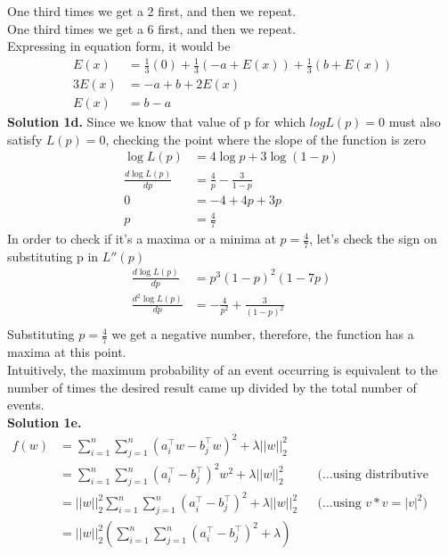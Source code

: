 \documentclass[11pt]{article}
\begin{document}
One third times we get a 2 first, and then we repeat. \\
One third times we get a 6 first, and then we repeat. \\
\linebreak
Expressing in equation form, it would be \\
\begin{equation*}\
\begin{split}
E(x) & = \frac{1}{3}(0) + \frac{1}{3}(-a + E(x)) + \frac{1}{3}(b + E(x)) \\
3 E(x) & = -a + b + 2E(x) \\
E(x) & = b-a
\end{split}
\end{equation*}
\linebreak
\textbf{Solution 1d.} Since we know that value of p for which $log L(p) = 0$ must also satisfy $L(p) = 0$, checking the point where the slope of the function is zero  \\
\begin{equation*}
\begin{split}
\log L(p) & = 4\log p + 3\log (1-p)\\
\frac{d \log L(p)}{d p} & = \frac{4}{p} - \frac{3}{1-p}\\
0 & = - 4 + 4p + 3p\\
p & = \frac{4}{7}
\end{split}
\end{equation*}
In order to check if it's a maxima or a minima at $ p = \frac{4}{7}$, let's check the sign on substituting p in $L''(p)$ \\
\begin{equation*}
\begin{split}
\frac{d \log L(p)}{d p} & = p^3 (1-p)^2 (1-7p)\\
\frac{d^2 \log L(p)}{d p} & = - \frac{4}{p^2} + \frac{3}{(1-p)^2}\\
\end{split}
\end{equation*}
Substituting $p= \frac{4}{7}$ we get a negative number, therefore, the function has a maxima at this point.\\
Intuitively, the maximum probability of an event occurring is equivalent to the number of times the desired result came up divided by the total number of events. \\
\linebreak
\textbf{Solution 1e.} \\
\begin{align*}
f(w) & = \sum_{i=1}^{n}\sum_{j=1}^{n} (a_i^\top w - b_j^\top w)^2 + \lambda||w||_2^2 \\
& = \sum_{i=1}^{n}\sum_{j=1}^{n} (a_i^\top - b_j^\top)^2 w^2 + \lambda||w||_2^2 && \text{(...using distributive property)} \\ 
& = ||w||_2^2 \sum_{i=1}^{n}\sum_{j=1}^{n} (a_i^\top - b_j^\top)^2 + \lambda||w||_2^2 && \text{(...using $v*v = |v|^2$)} \\
& = ||w||_2^2 (\sum_{i=1}^{n}\sum_{j=1}^{n} (a_i^\top - b_j^\top)^2 + \lambda)
\end{align*}
\end{document}
